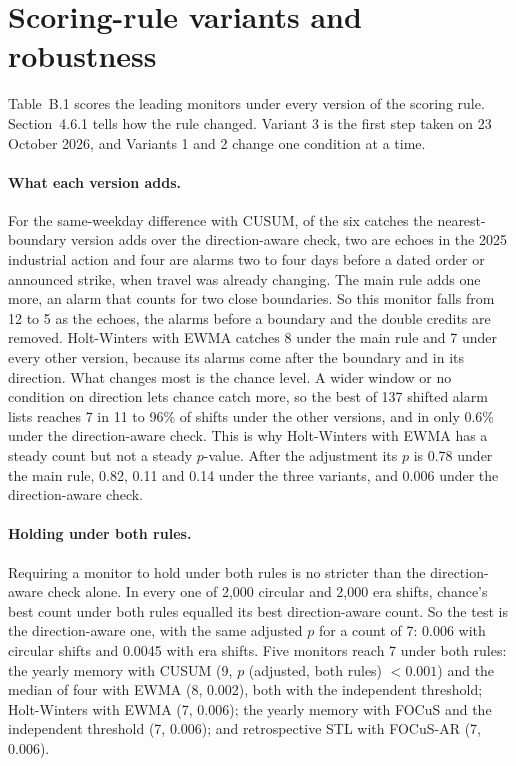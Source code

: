 

\section{Scoring-rule variants and robustness}\label{app:rules}

Table~B.1 scores the leading monitors under every version of the scoring rule. Section~4.6.1 tells how the rule changed. Variant 3 is the first step taken on 23 October 2026, and Variants 1 and 2 change one condition at a time.

\paragraph{What each version adds.} For the same-weekday difference with CUSUM, of the six catches the nearest-boundary version adds over the direction-aware check, two are echoes in the 2025 industrial action and four are alarms two to four days before a dated order or announced strike, when travel was already changing. The main rule adds one more, an alarm that counts for two close boundaries. So this monitor falls from 12 to 5 as the echoes, the alarms before a boundary and the double credits are removed. Holt-Winters with EWMA catches 8 under the main rule and 7 under every other version, because its alarms come after the boundary and in its direction. What changes most is the chance level. A wider window or no condition on direction lets chance catch more, so the best of 137 shifted alarm lists reaches 7 in 11 to 96\% of shifts under the other versions, and in only 0.6\% under the direction-aware check. This is why Holt-Winters with EWMA has a steady count but not a steady $p$-value. After the adjustment its $p$ is 0.78 under the main rule, 0.82, 0.11 and 0.14 under the three variants, and 0.006 under the direction-aware check.

\paragraph{Holding under both rules.} Requiring a monitor to hold under both rules is no stricter than the direction-aware check alone. In every one of 2{,}000 circular and 2{,}000 era shifts, chance's best count under both rules equalled its best direction-aware count. So the test is the direction-aware one, with the same adjusted $p$ for a count of 7: 0.006 with circular shifts and 0.0045 with era shifts. Five monitors reach 7 under both rules: the yearly memory with CUSUM (9, $p$ (adjusted, both rules) $<0.001$) and the median of four with EWMA (8, 0.002), both with the independent threshold; Holt-Winters with EWMA (7, 0.006); the yearly memory with FOCuS and the independent threshold (7, 0.006); and retrospective STL with FOCuS-AR (7, 0.006).

